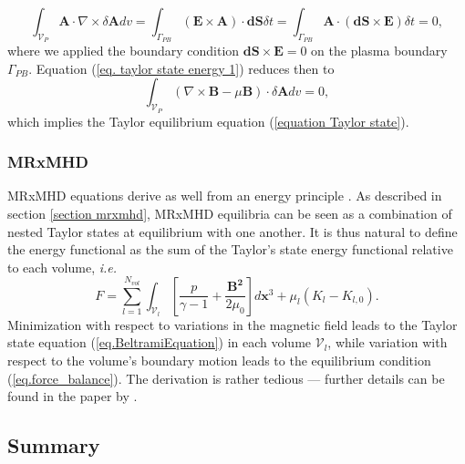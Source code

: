 \documentclass[my_thesis.tex]{subfiles}
\begin{document}
\begin{equation}
	\int_{\mathcal{V}_P}\mathbf{A} \cdot \nabla \times \delta \mathbf{A} dv = \int_{\Gamma_{PB}}  (\mathbf{E}\times\mathbf{A})\cdot\mathbf{dS}\delta t = \int_{\Gamma_{PB}}  \mathbf{A}\cdot(\mathbf{dS}\times\mathbf{E})\delta t = 0,
\end{equation}
where we applied the boundary condition $\mathbf{dS}\times\mathbf{E}=0$ on the plasma boundary $\Gamma_{PB}$. Equation (\ref{eq. taylor state energy 1}) reduces then to
\begin{equation}
	\int_{\mathcal{V}_P} \left( \nabla \times \mathbf{B} - \mu \mathbf{B} \right) \cdot \delta \mathbf{A}dv = 0,
\end{equation}
which implies the Taylor equilibrium equation (\ref{equation Taylor state}).

\subsubsection{MRxMHD} \label{energy principle mrxmhd}
MRxMHD equations derive as well from an energy principle \citep{Dewar2015}. As described in section \ref{section mrxmhd}, MRxMHD equilibria can be seen as a combination of nested Taylor states at equilibrium with one another. It is thus natural to define the energy functional as the sum of the Taylor's state energy functional relative to each volume, \textit{i.e.}
\begin{equation}
	F = \sum_{l=1}^{N_{vol}} \int_{\mathcal{V}_l} \left[\frac{p}{\gamma-1}+\frac{\mathbf{B^2}}{2\mu_0}\right]d\mathbf{x}^3 + \mu_l(K_l-K_{l,0}). \label{eq.mrxmhd energy functional}
\end{equation}
Minimization with respect to variations in the magnetic field leads to the Taylor state equation (\ref{eq.BeltramiEquation}) in each volume $\mathcal{V}_l$, while variation with respect to the volume's boundary motion leads to the equilibrium condition (\ref{eq.force_balance}). The derivation is rather tedious --- further details can be found in the paper by \citet{Dewar2015}.

\subsection{Summary}
\end{document}

